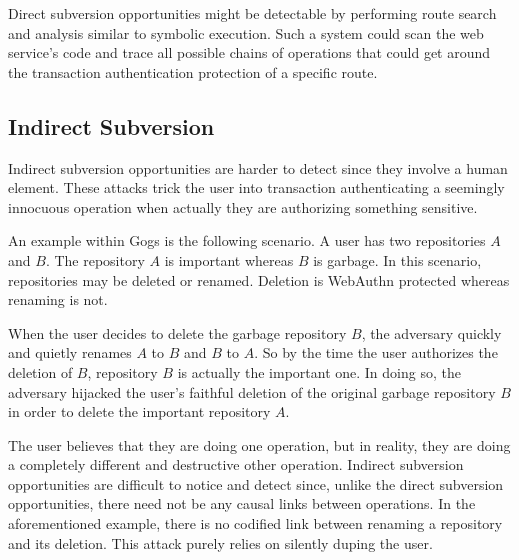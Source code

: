 Direct subversion opportunities might be detectable by performing route search and analysis similar to symbolic execution. Such a system could scan the web service's code and trace all possible chains of operations that could get around the transaction authentication protection of a specific route.

\subsection{Indirect Subversion}
Indirect subversion opportunities are harder to detect since they involve a human element. These attacks trick the user into transaction authenticating a seemingly innocuous operation when actually they are authorizing something sensitive. 

An example within Gogs is the following scenario. A user has two repositories $A$ and $B$. The repository $A$ is important whereas $B$ is garbage. In this scenario, repositories may be deleted or renamed. Deletion is WebAuthn protected whereas renaming is not.

When the user decides to delete the garbage repository $B$, the adversary quickly and quietly renames $A$ to $B$ and $B$ to $A$. So by the time the user authorizes the deletion of $B$, repository $B$ is actually the important one. In doing so, the adversary hijacked the user's faithful deletion of the original garbage repository $B$ in order to delete the important repository $A$. 

\iffalse
While the user is in the process of deleting a repository $B$, 
\fi

The user believes that they are doing one operation, but in reality, they are doing a completely different and destructive other operation. Indirect subversion opportunities are difficult to notice and detect since, unlike the direct subversion opportunities, there need not be any causal links between operations. In the aforementioned example, there is no codified link between renaming a repository and its deletion. This attack purely relies on silently duping the user.

